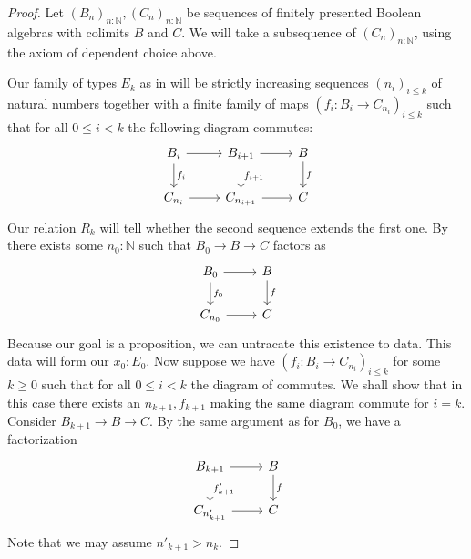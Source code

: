 \begin{proof}
  Let $(B_n)_{n:\mathbb N}, (C_n)_{n:\mathbb N}$ be 
  sequences of finitely presented Boolean algebras with colimits $B$ and $C$. 
  We will take a subsequence of $(C_n)_{n:\mathbb N}$, using the axiom of dependent choice above. 

  Our family of types $E_k$ as in  
  will be strictly increasing sequences $(n_i)_{i\leq k}$ of natural numbers together with a finite family of maps 
  $(f_i: B_{i} \to C_{n_i})_{i\leq k}$ such that
  for all $0\leq i<k$ the following diagram commutes:
  \begin{equation}\label{eqnDecompositionOfColimitMorphisms}
    \begin{tikzcd}
      B_{i} \arrow[r] \arrow[d, "f_i"]& B_{{i+1}} \arrow[r] \arrow[d,"f_{i+1}"]& B \arrow[d,"f"] \\
      C_{n_i} \arrow[r] & C_{n_{i+1}} \arrow[r] & C 
    \end{tikzcd}
  \end{equation}
  Our relation $R_k$ will tell whether the second sequence extends the first one. 
%
  By  
  there exists some $n_0:\mathbb N$ 
  such that $B_0 \to B \to C$ factors as 
  \begin{equation}
    \begin{tikzcd}
      B_{0} \arrow[r] \arrow[d, "f_0"]& B \arrow[d,"f"] \\
      C_{n_0} \arrow[r] & C 
    \end{tikzcd}
  \end{equation}
  Because our goal is a proposition, we can untracate this existence to data. 
  This data will form our $x_0:E_0$. %
%
  Now suppose we have $(f_i: B_{i} \to C_{n_i})_{i\leq k}$ for some $k\geq 0$ 
  such that
  for all $0\leq i<k$ the diagram of  commutes.
  We shall show that in this case there exists an $n_{k+1}, f_{k+1}$ 
  making the same diagram commute for $i = k$. 
  Consider $B_{{k}+1}\to B \to C$. By the same argument as for $B_0$, we have a factorization 
  \begin{equation}
    \begin{tikzcd}
    B_{k+1} \arrow[r]  \arrow[d,"f'_{k+1}"]& B \arrow[d,"f"]\\
    C_{n'_{k+1}} \arrow[r] & C
    \end{tikzcd}
  \end{equation}
  Note that we may assume $n'_{k+1} > n_k$.

\end{proof}
